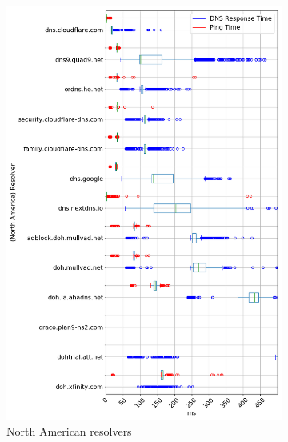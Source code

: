 \begin{figure}[t!]
    \centering
    \begin{subfigure}[t]{0.5\textwidth}
        \centering
        \includegraphics[width=\linewidth]{figures/Seoul_North_America.png}
        \caption{North American resolvers}
    \end{subfigure}%
    ~ 
    \begin{subfigure}[t]{0.5\textwidth}
        \centering

\end{subfigure}
\end{figure}
